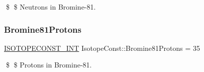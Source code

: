 \$ \$ Neutrons in Bromine-\/81. \mbox{\label{group___isotope_const-_bromine-_br81_gac87e8e62fbaeeb2dcc14c44fd904fc38}} 
\subsubsection{\texorpdfstring{Bromine81\+Protons}{Bromine81Protons}}
{\footnotesize\ttfamily \mbox{\hyperlink{group___isotope_const-_macros_ga5f18360b3e99483a35c32d789e62621c}{I\+S\+O\+T\+O\+P\+E\+C\+O\+N\+S\+T\+\_\+\+I\+NT}} Isotope\+Const\+::\+Bromine81\+Protons = 35}

\$ \$ Protons in Bromine-\/81. 